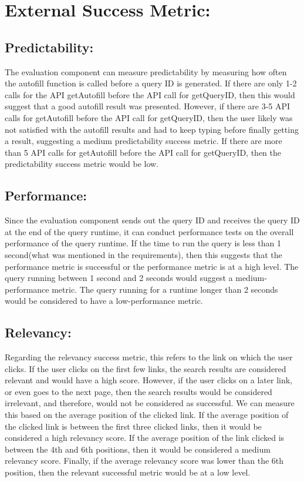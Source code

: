 \documentclass{article}
\begin{document}
\bigskip

\section{External Success Metric:}

\medskip

\subsection{Predictability:}

The evaluation component can measure predictability by measuring how often the 
autofill function is called before a query ID is generated. If there are only 1-2 
calls for the API getAutofill before the API call for getQueryID, then this would 
suggest that a good autofill result was presented. However, if there are 3-5 API 
calls for getAutofill before the API call for getQueryID, then the user likely was 
not satisfied with the autofill results and had to keep typing before finally 
getting a result, suggesting a medium predictability success metric. If there are 
more than 5 API calls for getAutofill before the API call for getQueryID, then the 
predictability success metric would be low.

\smallskip

\subsection{Performance:}
Since the evaluation component sends out the query ID and receives the query ID at 
the end of the query runtime, it can conduct performance tests on the overall 
performance of the query runtime. If the time to run the query is less than 1 
second(what was mentioned in the requirements), then this suggests that the 
performance metric is successful or the performance metric is at a high level. The 
query running between 1 second and 2 seconds would suggest a medium-performance 
metric. The query running for a runtime longer than 2 seconds would be considered 
to have a low-performance metric. 

\smallskip

\subsection{Relevancy:}
Regarding the relevancy success metric, this refers to the link on which the user 
clicks. If the user clicks on the first few links, the search results are 
considered relevant and would have a high score. However, if the user clicks on a 
later link, or even goes to the next page, then the search results would be 
considered irrelevant, and therefore, would not be considered as successful. We 
can measure this based on the average position of the clicked link. If the average 
position of the clicked link is between the first three clicked links, then it 
would be considered a high relevancy score. If the average position of the link 
clicked is between the 4th and 6th positions, then it would be considered a medium 
relevancy score. Finally, if the average relevancy score was lower than the 6th 
position, then the relevant successful metric would be at a low level.
\end{document}
